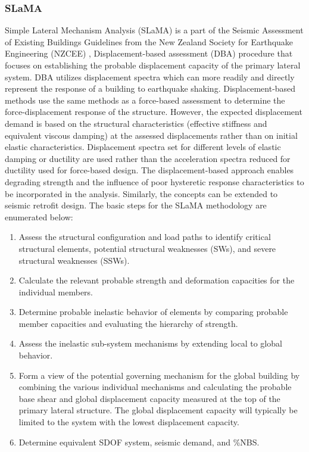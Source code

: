 \subsubsection{SLaMA}

Simple Lateral Mechanism Analysis (SLaMA) is a part of the Seismic Assessment of Existing Buildings Guidelines from the New Zealand Society for Earthquake Engineering (NZCEE) \cite{NZSEE2019},  Displacement-based assessment (DBA) procedure that focuses on establishing the probable displacement capacity of the primary lateral system. DBA utilizes displacement spectra which can more readily and directly represent the response of a building to earthquake shaking. Displacement-based methods use the same methods as a force-based assessment to determine the force-displacement response of the structure. However, the expected displacement demand is based on the structural characteristics (effective stiffness and equivalent viscous damping) at the assessed displacements rather than on initial elastic characteristics. Displacement spectra set for different levels of elastic damping or ductility are used rather than the acceleration spectra reduced for ductility used for force-based design. The displacement-based approach enables degrading strength and the influence of poor
hysteretic response characteristics to be incorporated in the analysis. Similarly, the concepts can be extended to seismic retrofit design. The basic steps for the SLaMA methodology are enumerated below:

\begin{enumerate}
    \item Assess the structural configuration and load paths to identify critical structural elements, potential structural weaknesses (SWs), and severe structural weaknesses (SSWs).
    \item Calculate the relevant probable strength and deformation capacities for the individual members.
    \item Determine probable inelastic behavior of elements by comparing probable member capacities and evaluating the hierarchy of strength.
    \item Assess the inelastic sub-system mechanisms by extending local to global behavior.
    \item Form a view of the potential governing mechanism for the global building by combining the various individual mechanisms and calculating the probable base shear and global displacement capacity measured at the top of the primary lateral structure. The global displacement capacity will typically be limited to the system with the lowest displacement capacity.
    \item Determine equivalent SDOF system, seismic demand, and \%NBS.
\end{enumerate}

